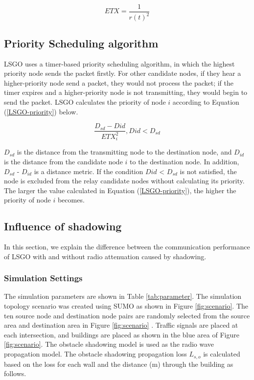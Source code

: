 \documentclass[conference]{IEEEtran}
\begin{document}
 \begin{equation}
 \label{equ-intersection}
 ETX = \frac{1}{  {r(t)}^{2}   } 
 \end{equation}



\subsection{Priority Scheduling algorithm}
LSGO uses a timer-based priority scheduling algorithm, in which the highest priority node sends the packet firstly. For other candidate nodes, if they hear a higher-priority node send a packet, they would not process the packet; if the timer expires and a higher-priority node is not transmitting, they would begin to send the packet.  LSGO calculates the priority of node $i$ according to Equation (\ref{LSGO-priority}) below.

\begin{equation}
\label{LSGO-priority}
\frac{D_{sd} - D{id}}{ETX_{i}^{2}} ,   D{id} < D_{sd}
\end{equation}

$D_{sd}$ is the distance from the transmitting node to the destination node, and $D_{id}$ is the distance from the candidate node $i$ to the destination node. In addition, $D_{sd}$ - $D_{id}$ is a distance metric. If the condition $D{id}$ < $D_{sd}$ is not satisfied, the node is excluded from the relay candidate nodes without calculating its priority. The larger the value calculated in Equation (\ref{LSGO-priority}), the higher the priority of node $i$ becomes. 

\subsection{Influence of shadowing}
\label{shadowing_evaluation}
In this section, we explain the difference between the communication performance of LSGO with and without radio attenuation caused by shadowing. 


\subsubsection{Simulation Settings} 
The simulation parameters are shown in Table \ref{tab:parameter}. 
The simulation topology scenario was created using SUMO as shown in Figure \ref{fig:scenario}. 
The ten source node and destination node pairs  are randomly selected from the source area and destination area in Figure \ref{fig:scenario} .
 Traffic signals are placed at each intersection, and buildings are placed as shown in the blue area of Figure \ref{fig:scenario}. 
The obstacle shadowing model \cite{20} is used as the radio wave propagation model. The obstacle shadowing propagation loss $L_{s,o}$ is calculated based on the loss for each wall and the distance (m) through the building as follows.
\end{document}
